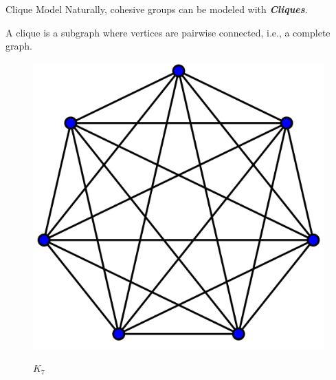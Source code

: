 \documentclass[9pt]{beamer} %
\begin{document}
\begin{frame}{Clique Model}
    Naturally, cohesive groups can be modeled with \textbf{\emph{Cliques}}.
    
    A clique is a subgraph where vertices are pairwise connected, i.e., a complete graph.
    
    \centering
    \begin{minipage}[c]{0.4\linewidth}
        \begin{figure}[h]
            \centering
            \includegraphics[height=.3\textheight]{pic/k7.png}\\
            \caption{$K_7$}
        \end{figure}
    \end{minipage}\hspace{1cm}
    \begin{minipage}{0.4\linewidth}
        \medskip
        \begin{figure}[h]
            \centering

\end{figure}
\end{minipage}
\end{frame}
\end{document}
